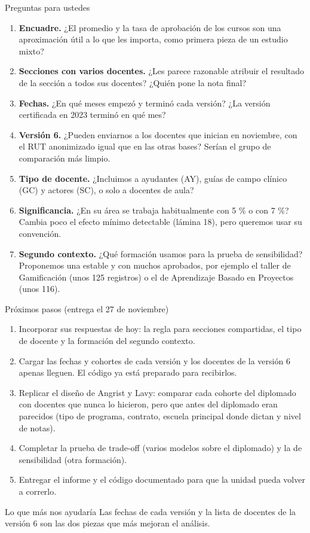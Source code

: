 \documentclass[10pt,aspectratio=169]{beamer}
\begin{document}
\begin{frame}{Preguntas para ustedes}
  \small
  \begin{enumerate}
    \item \textbf{Encuadre.} ¿El promedio y la tasa de aprobación de los cursos son una aproximación útil a lo que les importa, como primera pieza de un estudio mixto?
    \item \textbf{Secciones con varios docentes.} ¿Les parece razonable atribuir el resultado de la sección a todos sus docentes? ¿Quién pone la nota final?
    \item \textbf{Fechas.} ¿En qué meses empezó y terminó cada versión? ¿La versión certificada en 2023 terminó en qué mes?
    \item \textbf{Versión 6.} ¿Pueden enviarnos a los docentes que inician en noviembre, con el RUT anonimizado igual que en las otras bases? Serían el grupo de comparación más limpio.
    \item \textbf{Tipo de docente.} ¿Incluimos a ayudantes (AY), guías de campo clínico (GC) y actores (SC), o solo a docentes de aula?
    \item \textbf{Significancia.} ¿En su área se trabaja habitualmente con 5 \% o con 7 \%? Cambia poco el efecto mínimo detectable (lámina 18), pero queremos usar su convención.
    \item \textbf{Segundo contexto.} ¿Qué formación usamos para la prueba de sensibilidad? Proponemos una estable y con muchos aprobados, por ejemplo el taller de Gamificación (unos 125 registros) o el de Aprendizaje Basado en Proyectos (unos 116).
  \end{enumerate}
\end{frame}

\begin{frame}{Próximos pasos (entrega el 27 de noviembre)}
  \begin{enumerate}
    \item Incorporar sus respuestas de hoy: la regla para secciones compartidas, el tipo de docente y la formación del segundo contexto.
    \item Cargar las fechas y cohortes de cada versión y los docentes de la versión 6 apenas lleguen. El código ya está preparado para recibirlos.
    \item Replicar el diseño de Angrist y Lavy: comparar cada cohorte del diplomado con docentes que nunca lo hicieron, pero que antes del diplomado eran parecidos (tipo de programa, contrato, escuela principal donde dictan y nivel de notas).
    \item Completar la prueba de trade-off (varios modelos sobre el diplomado) y la de sensibilidad (otra formación).
    \item Entregar el informe y el código documentado para que la unidad pueda volver a correrlo.
  \end{enumerate}
  \vspace{0.6em}
  \begin{block}{Lo que más nos ayudaría}
    Las fechas de cada versión y la lista de docentes de la versión 6 son las dos piezas que más mejoran el análisis.
  \end{block}
\end{frame}
\end{document}
